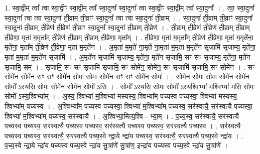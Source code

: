 \documentclass[17pt]{extarticle}
\begin{document}
1. स्वा॒द्वीम् त्वा᳚ त्वा स्वा॒द्वीꣳ स्वा॒द्वीम् त्वा᳚ स्वा॒दुना᳚ स्वा॒दुना᳚ त्वा स्वा॒द्वीꣳ स्वा॒द्वीम् त्वा᳚ स्वा॒दुना᳚ । . त्वा॒ स्वा॒दुना᳚ स्वा॒दुना᳚ त्वा त्वा स्वा॒दुना॑ ती॒व्राम् ती॒व्राꣳ स्वा॒दुना᳚ त्वा त्वा स्वा॒दुना॑ ती॒व्राम् । . स्वा॒दुना॑ ती॒व्राम् ती॒व्राꣳ स्वा॒दुना᳚ स्वा॒दुना॑ ती॒व्राम् ती॒व्रेण॑ ती॒व्रेण॑ ती॒व्राꣳ स्वा॒दुना᳚ स्वा॒दुना॑ ती॒व्राम् ती॒व्रेण॑ । . ती॒व्राम् ती॒व्रेण॑ ती॒व्रेण॑ ती॒व्राम् ती॒व्राम् ती॒व्रेणा॒ मृता॑ म॒मृता᳚म् ती॒व्रेण॑ ती॒व्राम् ती॒व्राम् ती॒व्रेणा॒ मृता᳚म् । . ती॒व्रेणा॒ मृता॑ म॒मृता᳚म् ती॒व्रेण॑ ती॒व्रेणा॒ मृता॑ म॒मृते॑ना॒ मृते॑ना॒ मृता᳚म् ती॒व्रेण॑ ती॒व्रेणा॒ मृता॑ म॒मृते॑न । . अ॒मृता॑ म॒मृते॑ ना॒मृते॑ ना॒मृता॑ म॒मृता॑ म॒मृते॑न सृ॒जामि॑ सृ॒जाम्य॒ मृते॑ना॒ मृता॑ म॒मृता॑ म॒मृते॑न सृ॒जामि॑ । . अ॒मृते॑न सृ॒जामि॑ सृ॒जाम्य॒ मृते॑ना॒ मृते॑न सृ॒जामि॒ सꣳ सꣳ सृ॒जाम्य॒ मृते॑ना॒ मृते॑न सृ॒जामि॒ सम् । . सृ॒जामि॒ सꣳ सꣳ सृ॒जामि॑ सृ॒जामि॒ सꣳ सोमे॑न॒ सोमे॑न॒ सꣳ सृ॒जामि॑ सृ॒जामि॒ सꣳ सोमे॑न । . सꣳ सोमे॑न॒ सोमे॑न॒ सꣳ सꣳ सोमे॑न॒ सोमः॒ सोमः॒ सोमे॑न॒ सꣳ सꣳ सोमे॑न॒ सोमः॑ । . सोमे॑न॒ सोमः॒ सोमः॒ सोमे॑न॒ सोमे॑न॒ सोमो᳚ ऽस्यसि॒ सोमः॒ सोमे॑न॒ सोमे॑न॒ सोमो॑ ऽसि । . सोमो᳚ ऽस्यसि॒ सोमः॒ सोमो᳚ ऽस्य॒श्विभ्या॑ म॒श्विभ्या॑ मसि॒ सोमः॒ सोमो᳚ ऽस्य॒श्विभ्या᳚म् । . अ॒स्य॒ श्विभ्या॑ म॒श्विभ्या॑ मस्यस्य॒ श्विभ्या᳚म् पच्यस्व पच्यस्वा॒ श्विभ्या॑ मस्यस्य॒ श्विभ्या᳚म् पच्यस्व । . अ॒श्विभ्या᳚म् पच्यस्व पच्यस्वा॒ श्विभ्या॑ म॒श्विभ्या᳚म् पच्यस्व॒ सर॑स्वत्यै॒ सर॑स्वत्यै पच्यस्वा॒ श्विभ्या॑ म॒श्विभ्या᳚म् पच्यस्व॒ सर॑स्वत्यै । . अ॒श्विभ्या॒मित्य॒श्वि - भ्या॒म् । . प॒च्य॒स्व॒ सर॑स्वत्यै॒ सर॑स्वत्यै पच्यस्व पच्यस्व॒ सर॑स्वत्यै पच्यस्व पच्यस्व॒ सर॑स्वत्यै पच्यस्व पच्यस्व॒ सर॑स्वत्यै पच्यस्व । . सर॑स्वत्यै पच्यस्व पच्यस्व॒ सर॑स्वत्यै॒ सर॑स्वत्यै पच्य॒स्वे न्द्रा॒ये न्द्रा॑य पच्यस्व॒ सर॑स्वत्यै॒ सर॑स्वत्यै पच्य॒स्वे न्द्रा॑य । . प॒च्य॒स्वे न्द्रा॒ये न्द्रा॑य पच्यस्व पच्य॒स्वे न्द्रा॑य सु॒त्रांणे॑ सु॒त्रांण॒ इन्द्रा॑य पच्यस्व पच्य॒स्वे न्द्रा॑य सु॒त्रांणे᳚ । \newline
\end{document}
